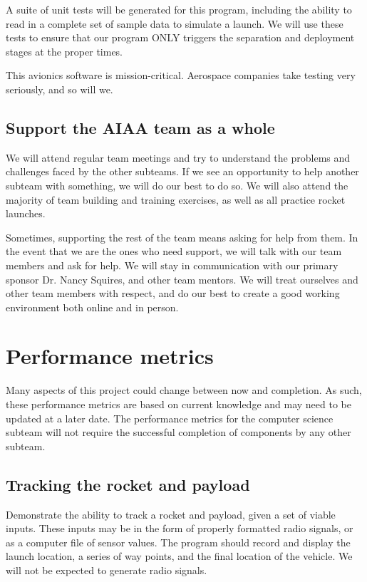 \documentclass[onecolumn, draftclsnofoot,10pt, compsoc]{IEEEtran}
\begin{document}
A suite of unit tests will be generated for this program, including the ability to read in a complete set of sample data to simulate a launch.  We will use these tests to ensure that our program ONLY triggers the separation and deployment stages at the proper times.

This avionics software is mission-critical.  Aerospace companies take testing very seriously, and so will we.

\subsection{Support the AIAA team as a whole}
We will attend regular team meetings and try to understand the problems and challenges faced by the other subteams.  If we see an opportunity to help another subteam with something, we will do our best to do so.  We will also attend the majority of team building and training exercises, as well as all practice rocket launches.

Sometimes, supporting the rest of the team means asking for help from them.  In the event that we are the ones who need support, we will talk with our team members and ask for help.  We will stay in communication with our primary sponsor Dr. Nancy Squires, and other team mentors.  We will treat ourselves and other team members with respect, and do our best to create a good working environment both online and in person.

\section{Performance metrics}
Many aspects of this project could change between now and completion. As such, these performance metrics are based on current knowledge and may need to be updated at a later date.  The performance metrics for the computer science subteam will not require the successful completion of components by any other subteam.

\subsection{Tracking the rocket and payload}
Demonstrate the ability to track a rocket and payload, given a set of viable inputs.  These inputs may be in the form of properly formatted radio signals, or as a computer file of sensor values.  The program should record and display the launch location, a series of way points, and the final location of the vehicle.  We will not be expected to generate radio signals.
\end{document}
